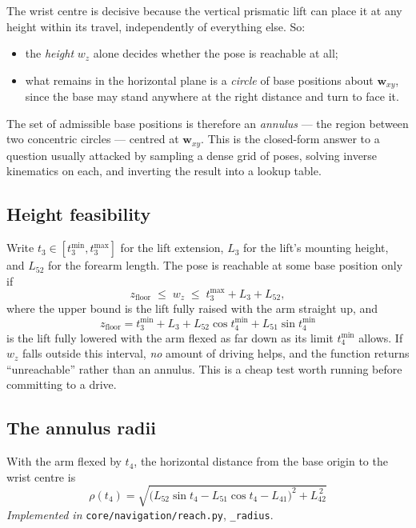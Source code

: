 \documentclass[11pt,a4paper]{article}
\begin{document}
The wrist centre is decisive because the vertical prismatic lift can place it at
any height within its travel, independently of everything else. So:

\begin{itemize}
\item the \emph{height} $w_z$ alone decides whether the pose is reachable at all;
\item what remains in the horizontal plane is a \emph{circle} of base positions
      about $\mathbf{w}_{xy}$, since the base may stand anywhere at the right
      distance and turn to face it.
\end{itemize}

The set of admissible base positions is therefore an \emph{annulus} --- the
region between two concentric circles --- centred at $\mathbf{w}_{xy}$. This is
the closed-form answer to a question usually attacked by sampling a dense grid of
poses, solving inverse kinematics on each, and inverting the result into a
lookup table.

\subsection{Height feasibility}

Write $t_3 \in [t_3^{\min}, t_3^{\max}]$ for the lift extension, $L_3$ for the
lift's mounting height, and $L_{52}$ for the forearm length. The pose is
reachable at some base position only if
\begin{equation}
z_{\text{floor}} \;\le\; w_z \;\le\; t_3^{\max} + L_3 + L_{52},
\end{equation}
where the upper bound is the lift fully raised with the arm straight up, and
\begin{equation}
z_{\text{floor}} = t_3^{\min} + L_3 + L_{52}\cos t_4^{\min} + L_{51}\sin t_4^{\min}
\end{equation}
is the lift fully lowered with the arm flexed as far down as its limit
$t_4^{\min}$ allows. If $w_z$ falls outside this interval, \emph{no} amount of
driving helps, and the function returns ``unreachable'' rather than an annulus.
This is a cheap test worth running before committing to a drive.

\subsection{The annulus radii}

With the arm flexed by $t_4$, the horizontal distance from the base origin to the
wrist centre is
\begin{equation}
\boxed{\;
\rho(t_4) = \sqrt{\big(L_{52}\sin t_4 - L_{51}\cos t_4 - L_{41}\big)^2 + L_{42}^{\,2}} \;}
\label{eq:rho}
\end{equation}
\textit{Implemented in} \texttt{core/navigation/reach.py}, \texttt{\_radius}.
\end{document}
